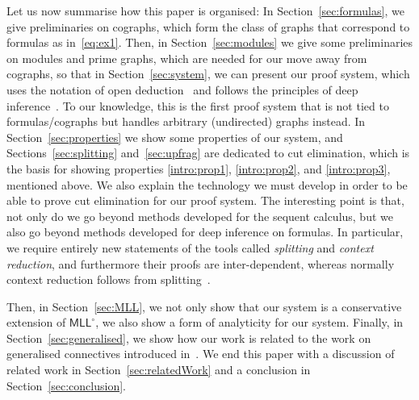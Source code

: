 \documentclass{lmcs} %
\def\MLLm{\mathsf{MLL^\circ}}
\theoremstyle{plain}
\begin{document}
\medskip


Let us now summarise how this paper is organised:
In
Section~\ref{sec:formulas}, we give preliminaries on cographs, which
form the class of graphs that correspond to formulas as
in~\eqref{eq:ex1}. Then, in Section~\ref{sec:modules} we give some
preliminaries on modules and prime graphs, which are needed for our
move away from cographs, so that in Section~\ref{sec:system}, we can
present our proof system, which uses the notation of open
deduction~\cite{gug:gun:par:2010} and follows the principles of deep
inference~\cite{gug:str:01,brunnler:tiu:01,gug:SIS}.  To our
knowledge, this is the first proof system that is not tied to
formulas/cographs but handles arbitrary (undirected) graphs instead.
In Section~\ref{sec:properties} we show some properties of our system,
and 
Sections~\ref{sec:splitting} and~\ref{sec:upfrag}  
are dedicated to cut elimination, which is the basis for showing properties \eqref{intro:prop1}, \eqref{intro:prop2}, and \eqref{intro:prop3}, mentioned above.
We also explain the technology we must develop in order to be able
to prove cut elimination for our proof system. 
The interesting point
is that, not only do we go beyond methods developed for the sequent
calculus, but we also go beyond methods developed for deep inference
on formulas.  In particular, we require entirely new statements of the
tools called \textit{splitting} and \textit{context reduction}, and
furthermore their proofs are inter-dependent, whereas normally context
reduction follows from splitting~\cite{SIS-V,gug:tub:split}. 


Then, in
Section~\ref{sec:MLL}, we not only show that our system is a conservative
extension of $\MLLm$, we also show a form of analyticity for our system. 
Finally, in Section~\ref{sec:generalised}, we
show how our work is related to the work on generalised
connectives 
introduced in~\cite{girard:87:b,danos:regnier:89}.
We end this paper with a discussion of related work in
Section~\ref{sec:relatedWork}
and a
conclusion in Section~\ref{sec:conclusion}.

\medskip
\end{document}
